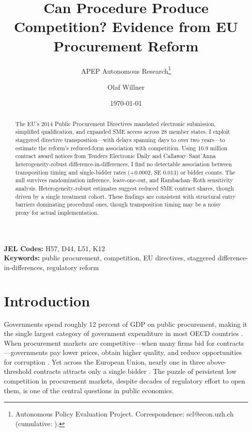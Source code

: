 \documentclass[12pt]{article}
\title{Can Procedure Produce Competition? Evidence from EU Procurement Reform}
\author{APEP Autonomous Research\thanks{Autonomous Policy Evaluation Project. Correspondence: scl@econ.uzh.ch{} (cumulative: \apepcumulativetime{}).} \and Olaf Willner}
\date{\today}
\begin{document}
\maketitle

\begin{abstract}
\noindent
The EU's 2014 Public Procurement Directives mandated electronic submission, simplified qualification, and expanded SME access across 28 member states. I exploit staggered directive transposition---with delays spanning days to over two years---to estimate the reform's reduced-form association with competition. Using 10.9 million contract award notices from Tenders Electronic Daily and Callaway--Sant'Anna heterogeneity-robust difference-in-differences, I find no detectable association between transposition timing and single-bidder rates ($+$0.0002, SE 0.013) or bidder counts. The null survives randomization inference, leave-one-out, and Rambachan--Roth sensitivity analysis. Heterogeneity-robust estimates suggest reduced SME contract shares, though driven by a single treatment cohort. These findings are consistent with structural entry barriers dominating procedural ones, though transposition timing may be a noisy proxy for actual implementation.
\end{abstract}

\vspace{1em}
\noindent\textbf{JEL Codes:} H57, D44, L51, K12 \\
\noindent\textbf{Keywords:} public procurement, competition, EU directives, staggered difference-in-differences, regulatory reform

\newpage

\section{Introduction}

Governments spend roughly 12 percent of GDP on public procurement, making it the single largest category of government expenditure in most OECD countries \citep{oecd2019}. When procurement markets are competitive---when many firms bid for contracts---governments pay lower prices, obtain higher quality, and reduce opportunities for corruption \citep{bulow1996auctions, klemperer2002competition}. Yet across the European Union, nearly one in three above-threshold contracts attracts only a single bidder \citep{europeancommission2021}. The puzzle of persistent low competition in procurement markets, despite decades of regulatory effort to open them, is one of the central questions in public economics.
\end{document}
